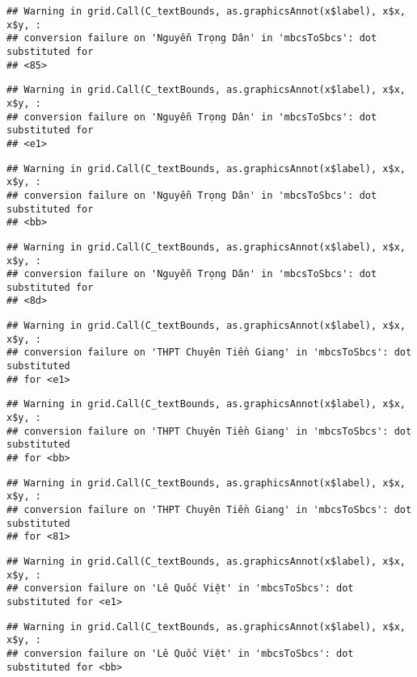\documentclass[
]{article}
\begin{document}
\begin{verbatim}
## Warning in grid.Call(C_textBounds, as.graphicsAnnot(x$label), x$x, x$y, :
## conversion failure on 'Nguyễn Trọng Dân' in 'mbcsToSbcs': dot substituted for
## <85>
\end{verbatim}

\begin{verbatim}
## Warning in grid.Call(C_textBounds, as.graphicsAnnot(x$label), x$x, x$y, :
## conversion failure on 'Nguyễn Trọng Dân' in 'mbcsToSbcs': dot substituted for
## <e1>
\end{verbatim}

\begin{verbatim}
## Warning in grid.Call(C_textBounds, as.graphicsAnnot(x$label), x$x, x$y, :
## conversion failure on 'Nguyễn Trọng Dân' in 'mbcsToSbcs': dot substituted for
## <bb>
\end{verbatim}

\begin{verbatim}
## Warning in grid.Call(C_textBounds, as.graphicsAnnot(x$label), x$x, x$y, :
## conversion failure on 'Nguyễn Trọng Dân' in 'mbcsToSbcs': dot substituted for
## <8d>
\end{verbatim}

\begin{verbatim}
## Warning in grid.Call(C_textBounds, as.graphicsAnnot(x$label), x$x, x$y, :
## conversion failure on 'THPT Chuyên Tiền Giang' in 'mbcsToSbcs': dot substituted
## for <e1>
\end{verbatim}

\begin{verbatim}
## Warning in grid.Call(C_textBounds, as.graphicsAnnot(x$label), x$x, x$y, :
## conversion failure on 'THPT Chuyên Tiền Giang' in 'mbcsToSbcs': dot substituted
## for <bb>
\end{verbatim}

\begin{verbatim}
## Warning in grid.Call(C_textBounds, as.graphicsAnnot(x$label), x$x, x$y, :
## conversion failure on 'THPT Chuyên Tiền Giang' in 'mbcsToSbcs': dot substituted
## for <81>
\end{verbatim}

\begin{verbatim}
## Warning in grid.Call(C_textBounds, as.graphicsAnnot(x$label), x$x, x$y, :
## conversion failure on 'Lê Quốc Việt' in 'mbcsToSbcs': dot substituted for <e1>
\end{verbatim}

\begin{verbatim}
## Warning in grid.Call(C_textBounds, as.graphicsAnnot(x$label), x$x, x$y, :
## conversion failure on 'Lê Quốc Việt' in 'mbcsToSbcs': dot substituted for <bb>
\end{verbatim}
\end{document}
